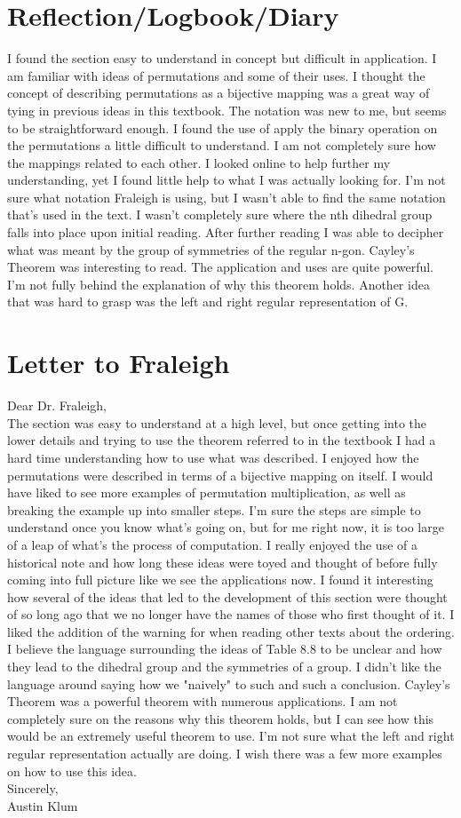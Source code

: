 \documentclass[11pt]{article}
\theoremstyle{plain}
\theoremstyle{definition}
\begin{document}
\section{Reflection/Logbook/Diary}
I found the section easy to understand in concept but difficult in application. I am familiar with ideas of permutations and some of their uses. I thought the concept of describing permutations as a bijective mapping was a great way of tying in previous ideas in this textbook. The notation was new to me, but seems to be straightforward enough. I found the use of apply the binary operation on the permutations a little difficult to understand. I am not completely sure how the mappings related to each other. I looked online to help further my understanding, yet I found little help to what I was actually looking for. I'm not sure what notation Fraleigh is using, but I wasn't able to find the same notation that's used in the text. I wasn't completely sure where the nth dihedral group falls into place upon initial reading. After further reading I was able to decipher what was meant by the group of symmetries of the regular n-gon. Cayley's Theorem was interesting to read. The application and uses are quite powerful. I'm not fully behind the explanation of why this theorem holds. Another idea that was hard to grasp was the left and right regular representation of G.


\section{Letter to Fraleigh}
Dear Dr. Fraleigh,\\
 The section was easy to understand at a high level, but once getting into the lower details and trying to use the theorem referred to in the textbook I had a hard time understanding how to use what was described. I enjoyed how the permutations were described in terms of a bijective mapping on itself. I would have liked to see more examples of permutation multiplication, as well as breaking the example up into smaller steps. I'm sure the steps are simple to understand once you know what's going on, but for me right now, it is too large of a leap of what's the process of computation. I really enjoyed the use of a historical note and how long these ideas were toyed and thought of before fully coming into full picture like we see the applications now. I found it interesting how several of the ideas that led to the development of this section were thought of so long ago that we no longer have the names of those who first thought of it. I liked the addition of the warning for when reading other texts about the ordering. I believe the language surrounding the ideas of Table 8.8 to be unclear and how they lead to the dihedral group and the symmetries of a group. I didn't like the language around saying how we "naively" to such and such a conclusion. Cayley's Theorem was a powerful theorem with numerous applications. I am not completely sure on the reasons why this theorem holds, but I can see how this would be an extremely useful theorem to use. I'm not sure what the left and right regular representation actually are doing. I wish there was a few more examples on how to use this idea.
\\
Sincerely,\\
Austin Klum
\end{document}
